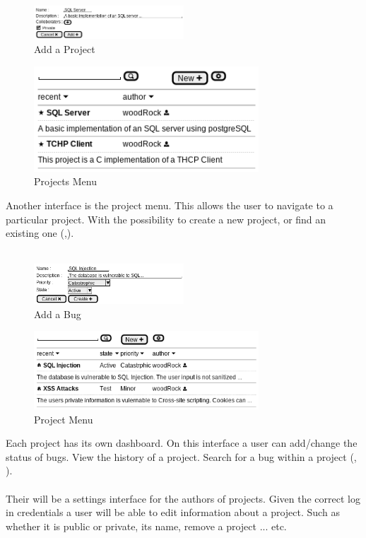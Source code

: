 \documentclass{article}
\begin{document}
\begin{figure}[H]\label{project}
\caption{Add a Project}
\centering
\includegraphics[width=0.5\textwidth]{project.png}
\end{figure}
\begin{figure}[H]\label{projects}
\caption{Projects Menu}
\centering
\includegraphics[width=0.75\textwidth]{projects.png}
\end{figure}
Another interface is the project menu. This allows the user to navigate to a particular project. With the possibility to create a new project, or find an existing one (,).
\\ \\
\begin{figure}[H]\label{bug}
\caption{Add a Bug}
\centering
\includegraphics[width=0.5\textwidth]{bug.png}
\end{figure}
\begin{figure}[H]\label{bugs}
\caption{Project Menu}
\centering
\includegraphics[width=0.75\textwidth]{bugs.png}
\end{figure}
Each project has its own dashboard. On this interface a user can add/change the status of bugs. View the history of a project. Search for a bug within a project (, ).
\\ \\
Their will be a settings interface for the authors of projects. Given the correct log in credentials a user will be able to edit information about a project. Such as whether it is public or private, its name, remove a project ... etc.
\end{document}
